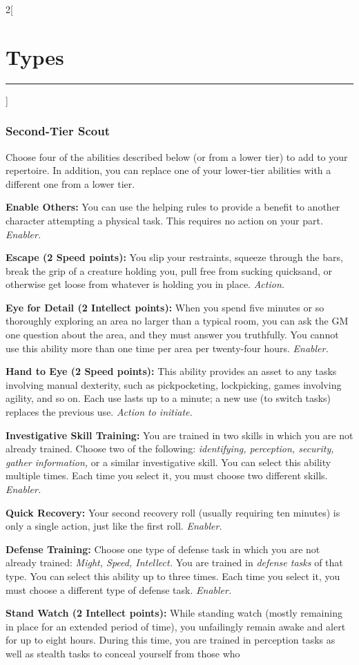 \documentclass[a4paper,10pt,final]{book}
\newcommand{\HRule}{\rule{\linewidth}{0.5mm}} %
\newcommand{\newSection}[1]{\section*{#1} \addcontentsline{toc}{section}{#1} \label{sec:#1} \HRule}
\newcommand{\itemAbility}[2]{\textcolor{25gray}{\textbullet\textbf{ #1:}} {#2}\par}
\newcommand{\enabler}{\textit{ Enabler.}}
\newcommand{\action}{\textit{ Action.}}
\newcommand{\actionInit}{\textit{ Action to initiate.}}
\newenvironment{docsection}[1]
{
  \begin{multicols*}{2}[\newSection{#1}]
}
{
  \end{multicols*}
  \newpage
}
\begin{document}
\begin{docsection}{Types}
\subsubsection*{Second-Tier Scout}
\label{subsub:scoutSecondTier}
Choose four of the abilities described
below (or from a lower tier) to add to your
repertoire. In addition, you can replace one
of your lower-tier abilities with a different
one from a lower tier. \par
\itemAbility{Enable Others}{You can use the helping
rules to provide a benefit to another
character attempting a physical task. This
requires no action on your part.\enabler}
\itemAbility{Escape (2 Speed points)}{You slip your
restraints, squeeze through the bars, break the
grip of a creature holding you, pull free from
sucking quicksand, or otherwise get loose
from whatever is holding you in place.\action}
\itemAbility{Eye for Detail (2 Intellect points)}{When
you spend five minutes or so thoroughly
exploring an area no larger than a typical
room, you can ask the GM one question
about the area, and they must answer you
truthfully. You cannot use this ability more
than one time per area per twenty-four
hours.\enabler}
\itemAbility{Hand to Eye (2 Speed points)}{This ability
provides an asset to any tasks involving
manual dexterity, such as pickpocketing,
lockpicking, games involving agility, and so
on. Each use lasts up to a minute; a new
use (to switch tasks) replaces the previous
use.\actionInit}
\itemAbility{Investigative Skill Training}{You are trained in two
skills in which you are not already trained.
Choose two of the following: \textit{identifying, perception, security, gather information,} or a similar investigative skill. 
You can select this ability multiple times. Each time you select it,
you must choose two different skills.\enabler}
\itemAbility{Quick Recovery}{Your second recovery
roll (usually requiring ten minutes) is only a
single action, just like the first roll.\enabler}
\itemAbility{Defense Training}{Choose one type of
defense task in which you are not already
trained: \textit{Might, Speed, Intellect.} You are
trained in \emph{defense tasks} of that type. You
can select this ability up to three times.
Each time you select it, you must choose a
different type of defense task.\enabler}
\itemAbility{Stand Watch (2 Intellect points)}{While
standing watch (mostly remaining in
place for an extended period of time), 
you unfailingly remain awake and alert for up
to eight hours. During this time, you are
trained in perception tasks as well as stealth
tasks to conceal yourself from those who
}
\end{docsection}
\end{document}
